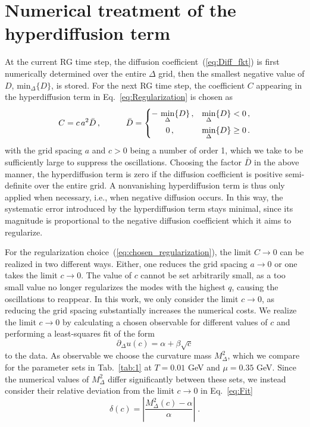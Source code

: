 \documentclass[
onecolumn,
aps,
prd,
amsmath,
amssymb,
nofootinbib
]{revtex4-2}
\begin{document}
\section{Numerical treatment of the hyperdiffusion term}
\label{sec:appendix_B}
At the current RG time step, the diffusion coefficient~(\ref{eq:Diff_fkt}) is first numerically determined over the entire $\Delta$ grid, then the smallest negative value of $D$, $\mathrm{min}_\Delta \{ D \}$, is stored.
For the next RG time step, the coefficient $C$ appearing in the hyperdiffusion term in Eq.~\eqref{eq:Regularization} is chosen as
\begin{equation}\label{eq:chosen_regularization}
	C = c\, a^2 \bar{D}\,,\quad \quad\quad
\bar{D} =
\begin{cases}
-\,\min\limits_{\Delta}\{D\}\,, & \min\limits_{\Delta}\{D\} < 0\,,\\[6pt]
\hspace{0.05\textwidth} 0\,, & \min\limits_{\Delta}\{D\} \ge 0\,.
\end{cases}
\end{equation}
with the grid spacing $a$ and $c>0$ being a number of order 1, which we take to be sufficiently large to suppress the oscillations. 
Choosing the factor $\bar{D}$ in the above manner, the hyperdiffusion term is zero if the diffusion coefficient is positive semi-definite over the entire grid.
A nonvanishing hyperdiffusion term is thus only applied when necessary, i.e., when negative diffusion occurs.
In this way, the systematic error introduced by the hyperdiffusion term stays minimal, since its magnitude is proportional to the negative diffusion coefficient which it aims to regularize. 


For the regularization choice~(\ref{eq:chosen_regularization}), the limit $C\to0$ can be realized in two different ways. 
Either, one reduces the grid spacing $a\to0$ or one takes the limit $c\to0$. 
The value of $c$ cannot be set arbitrarily small, as a too small value no longer regularizes the modes with the highest $q$, causing the oscillations to reappear. 
In this work, we only consider the limit $c\to0$, as reducing the grid spacing substantially increases the numerical costs.
We realize the limit $c\to 0$ by calculating a chosen observable for different values of $c$ and performing a least-squares fit of the form 
\begin{equation}\label{eq:Fit}
	\partial_\Delta u(c) = \alpha + \beta \sqrt{c}
\end{equation}
to the data. 
As observable we choose the curvature mass $M_\Delta^2$, which we compare for the parameter sets in Tab.~\ref{tab:1} at $T=0.01$ GeV and $\mu=0.35$ GeV. 
Since the numerical values of $M_\Delta^2$ differ significantly between these sets, we instead consider their relative deviation from the limit $c\to0$ in Eq.~\eqref{eq:Fit}
\begin{equation}
    \delta(c) = \left|\frac{M_\Delta^2(c)-\alpha}{\alpha}\right|\;.
\end{equation}
\end{document}
